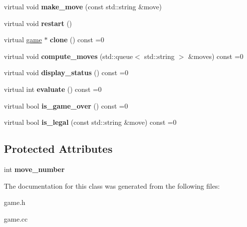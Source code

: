 \begin{DoxyCompactItemize}
\item 
\mbox{\label{classmain__savitch__14_1_1game_a20597d0caa907aea47b27fed8be3759b}} 
virtual void {\bfseries make\+\_\+move} (const std\+::string \&move)
\item 
\mbox{\label{classmain__savitch__14_1_1game_ad521a7d78e7c163a0bc28b709f0d45fd}} 
virtual void {\bfseries restart} ()
\item 
\mbox{\label{classmain__savitch__14_1_1game_a7b663057f59210dd52738facfc40d959}} 
virtual \mbox{\hyperlink{classmain__savitch__14_1_1game}{game}} $\ast$ {\bfseries clone} () const =0
\item 
\mbox{\label{classmain__savitch__14_1_1game_a2c0c049f5861026d0f639b5837889b7a}} 
virtual void {\bfseries compute\+\_\+moves} (std\+::queue$<$ std\+::string $>$ \&moves) const =0
\item 
\mbox{\label{classmain__savitch__14_1_1game_ac8205178922c49bab2865187e834b726}} 
virtual void {\bfseries display\+\_\+status} () const =0
\item 
\mbox{\label{classmain__savitch__14_1_1game_a9b9c8c5e9aa57c9a430f20b87cb047aa}} 
virtual int {\bfseries evaluate} () const =0
\item 
\mbox{\label{classmain__savitch__14_1_1game_a49eed20648918b03fd3e2cf78987b3d1}} 
virtual bool {\bfseries is\+\_\+game\+\_\+over} () const =0
\item 
\mbox{\label{classmain__savitch__14_1_1game_ad38351422ca1ee3ae58440c1c6b36b30}} 
virtual bool {\bfseries is\+\_\+legal} (const std\+::string \&move) const =0
\end{DoxyCompactItemize}
\subsection*{Protected Attributes}
\begin{DoxyCompactItemize}
\item 
\mbox{\label{classmain__savitch__14_1_1game_ac4c296f4370d8e5bb5ea74b638fb827d}} 
int {\bfseries move\+\_\+number}
\end{DoxyCompactItemize}


The documentation for this class was generated from the following files\+:\begin{DoxyCompactItemize}
\item 
game.\+h\item 
game.\+cc\end{DoxyCompactItemize}
